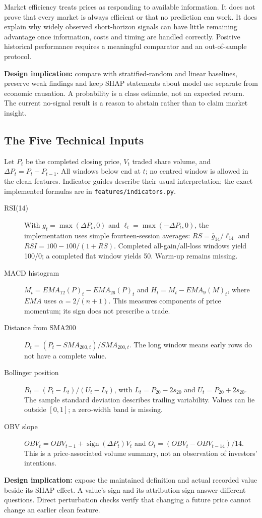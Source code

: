Market efficiency treats prices as responding to available information\cite{fama_1970}. It does not prove that every market is always efficient or that no prediction can work. It does explain why widely observed short-horizon signals can have little remaining advantage once information, costs and timing are handled correctly. Positive historical performance requires a meaningful comparator and an out-of-sample protocol.

\textbf{Design implication:} compare with stratified-random and linear baselines, preserve weak findings and keep SHAP statements about model use separate from economic causation. A probability is a class estimate, not an expected return. The current no-signal result is a reason to abstain rather than to claim market insight.
\subsection*{The Five Technical Inputs}
Let $P_t$ be the completed closing price, $V_t$ traded share volume, and $\Delta P_t=P_t-P_{t-1}$. All windows below end at $t$; no centred window is allowed in the clean features. Indicator guides describe their usual interpretation\cite{fidelity_rsi,fidelity_macd,fidelity_obv}; the exact implemented formulas are in \nolinkurl{features/indicators.py}.
\begin{description}
\item[RSI(14)] With $g_t=\max(\Delta P_t,0)$ and $\ell_t=\max(-\Delta P_t,0)$, the implementation uses simple fourteen-session averages: $RS=\overline g_{14}/\overline\ell_{14}$ and $RSI=100-100/(1+RS)$. Completed all-gain/all-loss windows yield 100/0; a completed flat window yields 50. Warm-up remains missing.
\item[MACD histogram] $M_t=EMA_{12}(P)_t-EMA_{26}(P)_t$ and $H_t=M_t-EMA_9(M)_t$, where $EMA$ uses $\alpha=2/(n+1)$. This measures components of price momentum; its sign does not prescribe a trade.
\item[Distance from SMA200] $D_t=(P_t-SMA_{200,t})/SMA_{200,t}$. The long window means early rows do not have a complete value.
\item[Bollinger position] $B_t=(P_t-L_t)/(U_t-L_t)$, with $L_t=\overline P_{20}-2s_{20}$ and $U_t=\overline P_{20}+2s_{20}$. The sample standard deviation describes trailing variability. Values can lie outside $[0,1]$; a zero-width band is missing.
\item[OBV slope] $OBV_t=OBV_{t-1}+\operatorname{sign}(\Delta P_t)V_t$ and $O_t=(OBV_t-OBV_{t-14})/14$. This is a price-associated volume summary, not an observation of investors' intentions.
\end{description}
\textbf{Design implication:} expose the maintained definition and actual recorded value beside its SHAP effect. A value's sign and its attribution sign answer different questions. Direct perturbation checks verify that changing a future price cannot change an earlier clean feature.
